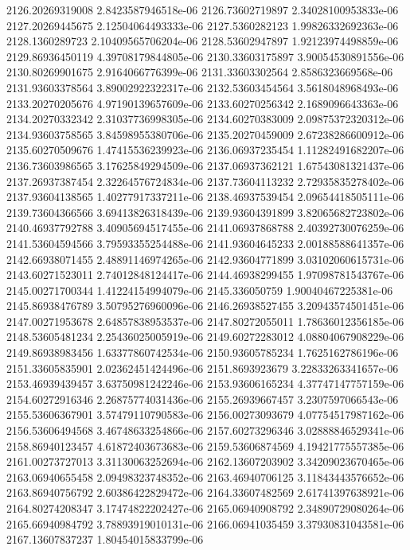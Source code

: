 {2126.20269319008 2.8423587946518e-06
2126.73602719897 2.34028100953833e-06
2127.20269445675 2.12504064493333e-06
2127.5360282123 1.99826332692363e-06
2128.1360289723 2.10409565706204e-06
2128.53602947897 1.92123974498859e-06
2129.86936450119 4.39708179844805e-06
2130.33603175897 3.90054530891556e-06
2130.80269901675 2.9164066776399e-06
2131.33603302564 2.8586323669568e-06
2131.93603378564 3.89002922322317e-06
2132.53603454564 3.5618048968493e-06
2133.20270205676 4.97190139657609e-06
2133.60270256342 2.1689096643363e-06
2134.20270332342 2.31037736998305e-06
2134.60270383009 2.09875372320312e-06
2134.93603758565 3.84598955380706e-06
2135.20270459009 2.67238286600912e-06
2135.60270509676 1.47415536239923e-06
2136.06937235454 1.11282491682207e-06
2136.73603986565 3.17625849294509e-06
2137.06937362121 1.67543081321437e-06
2137.26937387454 2.32264576724834e-06
2137.73604113232 2.72935835278402e-06
2137.93604138565 1.40277917337211e-06
2138.46937539454 2.09654418505111e-06
2139.73604366566 3.69413826318439e-06
2139.93604391899 3.82065682723802e-06
2140.46937792788 3.40905694517455e-06
2141.06937868788 2.40392730076259e-06
2141.53604594566 3.79593355254488e-06
2141.93604645233 2.00188588641357e-06
2142.66938071455 2.48891146974265e-06
2142.93604771899 3.03102060615731e-06
2143.60271523011 2.74012848124417e-06
2144.46938299455 1.97098781543767e-06
2145.00271700344 1.41224154994079e-06
2145.336050759 1.90040467225381e-06
2145.86938476789 3.50795276960096e-06
2146.26938527455 3.20943574501451e-06
2147.00271953678 2.64857838953537e-06
2147.80272055011 1.78636012356185e-06
2148.53605481234 2.25436025005919e-06
2149.60272283012 4.08804067908229e-06
2149.86938983456 1.63377860742534e-06
2150.93605785234 1.7625162786196e-06
2151.33605835901 2.02362451424496e-06
2151.8693923679 3.22833263341657e-06
2153.46939439457 3.63750981242246e-06
2153.93606165234 4.37747147757159e-06
2154.60272916346 2.26875774031436e-06
2155.26939667457 3.2307597066543e-06
2155.53606367901 3.57479110790583e-06
2156.00273093679 4.07754517987162e-06
2156.53606494568 3.46748633254866e-06
2157.60273296346 3.02888846529341e-06
2158.86940123457 4.61872403673683e-06
2159.53606874569 4.19421775557385e-06
2161.00273727013 3.31130063252694e-06
2162.13607203902 3.34209023670465e-06
2163.06940655458 2.09498323748352e-06
2163.46940706125 3.11843443576652e-06
2163.86940756792 2.60386422829472e-06
2164.33607482569 2.61741397638921e-06
2164.80274208347 3.17474822202427e-06
2165.06940908792 2.34890729080264e-06
2165.66940984792 3.78893919010131e-06
2166.06941035459 3.37930831043581e-06
2167.13607837237 1.80454015833799e-06
}
